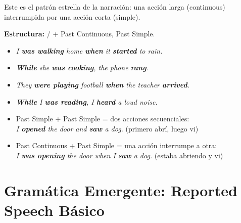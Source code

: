 \documentclass[12pt,a4paper]{article}
\begin{document}
\begin{cajagrammar}
Este es el patrón estrella de la narración: una acción larga (continuous) interrumpida por una acción corta (simple).

\medskip
\textbf{Estructura:}  /  + Past Continuous, Past Simple.

\begin{cajaejemplo}
\begin{itemize}[nosep, leftmargin=0.8cm]
  \item \textit{I \textbf{was walking} home \textbf{when} it \textbf{started} to rain.}
  \item \textit{\textbf{While} she \textbf{was cooking}, the phone \textbf{rang}.}
  \item \textit{They \textbf{were playing} football \textbf{when} the teacher \textbf{arrived}.}
  \item \textit{\textbf{While} I \textbf{was reading}, I \textbf{heard} a loud noise.}
\end{itemize}
\end{cajaejemplo}

\medskip
\begin{cajaejemplo}
\begin{itemize}[nosep, leftmargin=0.8cm]
  \item Past Simple + Past Simple = dos acciones secuenciales:\\
    \textit{I \textbf{opened} the door and \textbf{saw} a dog.} (primero abrí, luego vi)
  \item Past Continuous + Past Simple = una acción interrumpe a otra:\\
    \textit{I \textbf{was opening} the door when I \textbf{saw} a dog.} (estaba abriendo y vi)
\end{itemize}
\end{cajaejemplo}
\end{cajagrammar}

\section{Gramática Emergente: Reported Speech Básico}
\end{document}
